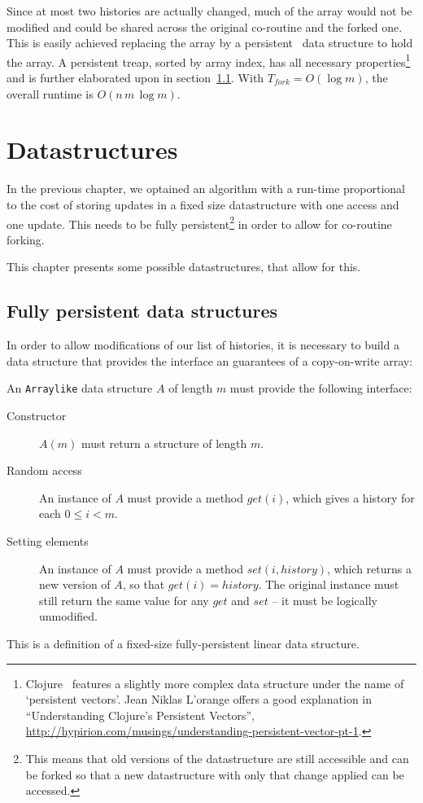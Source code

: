 \documentclass[11pt,a4paper,twoside,openright]{Thesis}
\theoremstyle{definition}
\newcommand{\Secref}[1]{section~\ref{sec:#1}}
\newcommand{\seclabel}[1]{\label{sec:#1}}
\begin{document}
Since at most two histories are actually changed, much of the 
array would not be modified and could be shared across the original
co-routine and the forked one. This is easily achieved replacing the
array by a persistent~\cite{Dris89a} data structure to hold the 
array. A persistent treap, sorted by array index, has all necessary
properties\footnote{Clojure~\cite{Hick08} features a slightly more complex data
structure under the name of `persistent vectors'. Jean Niklas L'orange offers a
good explanation in ``Understanding Clojure's Persistent Vectors'',
\url{http://hypirion.com/musings/understanding-persistent-vector-pt-1}.} and
is further elaborated upon in \Secref{treap}. With $T_{fork}=O(\log m)$,
the overall runtime is $O(n\,m\,\log m)$.

\chapter{Datastructures}\label{cha:data}
In the previous chapter, we optained an algorithm with a run-time 
proportional to the cost of storing updates in a fixed size datastructure 
with one access and one update. This needs to be fully 
persistent\footnote{This means that old versions of the datastructure are 
  still accessible and can be forked so that a new datastructure with only 
that change applied can be accessed.} in order to allow for co-routine forking.

This chapter presents some possible datastructures, that allow for this.

\section{Fully persistent data structures}	\seclabel{treap}\seclabel{data-structures}
In order to allow modifications of our list of histories, it is
necessary to build a data structure that provides the interface an guarantees 
of a copy-on-write array:

\begin{definition}
  An \texttt{Arraylike} data structure $A$ of length $m$ must provide the 
  following interface:
  \begin{description}
    \item[Constructor] $A(m)$ must return a structure of length $m$.
    \item[Random access] An instance of $A$ must provide a method $get(i)$,
      which gives a history for each $0 \leq i < m$.
    \item[Setting elements] An instance of $A$ must provide a method $set(i,
      history)$, which returns a new version of $A$, so that $get(i) = history$.
      The original instance must still return the same value for any $get$ 
      and $set$ -- it must be logically unmodified.
  \end{description}

  This is a definition of a fixed-size fully-persistent linear data structure.
\end{definition}
\end{document}
